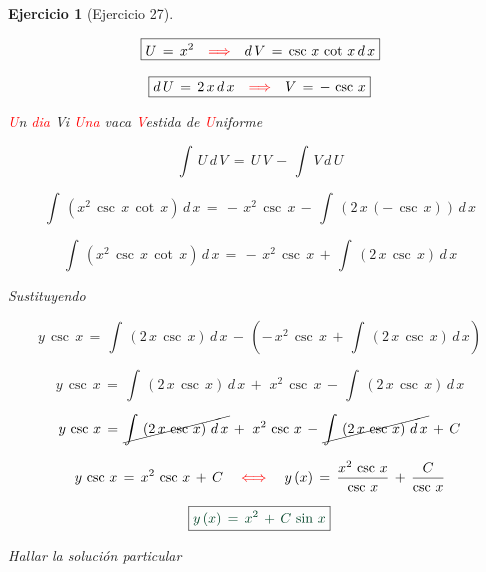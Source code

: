 \documentclass[a4paper,11pt]{book}
\newtheorem{ejer}{Ejercicio}[section]
\begin{document}
\begin{ejer}[Ejercicio 27]
\begin{tcolorbox}[colback=red!5!white,colframe=red!75!black,fonttitle=\bfseries,title=$I_{2}$]
  

$$\boxed{U\,=\,x^{2} \quad \textcolor{red}{\Longrightarrow} \quad d\,V\,=\,\csc\,x\,\cot\,x\,d\,x }$$ 

  

$$\boxed{d\,U\,=\,2\,x\,d\,x \quad \textcolor{red}{\Longrightarrow} \quad V\,=\,-\,\csc\,x }$$ 

 


\textcolor{red}{U}n \textcolor{red}{dia} Vi \textcolor{red}{Una} vaca \textcolor{red}{V}estida de \textcolor{red}{U}niforme      



  

$$\int\,U\,d\,V\,=\,U\,V\,-\,\int\,V\,d\,U$$ 

  

$$\int\,\left(x^{2}\,\csc\,x\,\cot\,x \right)\,d\,x\,=\,-\,x^{2}\,\csc\,x\,-\,\int\,\left(2\,x\,(-\,\csc\,x) \right)\,d\,x$$ 

  

$$\boxed{\int\,\left(x^{2}\,\csc\,x\,\cot\,x \right)\,d\,x\,=\,-\,x^{2}\,\csc\,x\,+\,\int\,\left(2\,x\,\csc\,x \right)\,d\,x}$$ 

  

\end{tcolorbox} 

  

Sustituyendo 

  

$$y\,\csc\,x\,=\,\int\,\left( 2\,x\,\csc\,x \right)\,d\,x\,-\,\left(-\,x^{2}\,\csc\,x\,+\,\int\,\left(2\,x\,\csc\,x \right)\,d\,x \right)$$ 

  

$$y\,\csc\,x\,=\,\int\,\left( 2\,x\,\csc\,x \right)\,d\,x\,+\,\,x^{2}\,\csc\,x\,-\,\int\,\left(2\,x\,\csc\,x \right)\,d\,x $$ 

  

$$y\,\csc\,x\,=\,\cancel{\int\,\left( 2\,x\,\csc\,x \right)\,d\,x}\,+\,\,x^{2}\,\csc\,x\,-\,\cancel{\int\,\left(2\,x\,\csc\,x \right)\,d\,x}\,+\,C $$ 

  

$$y\,\csc\,x\,=\,x^{2}\,\csc\,x\,+\,C\quad \textcolor{red}{\iff} \quad y\,(x)\,=\,\dfrac{x^{2}\,\csc\,x}{\csc\,x}\,+\,\dfrac{C}{\csc\,x}$$ 

  

$$\boxed{\textcolor{britishracinggreen}{y\,(x)\,=\,x^{2}\,+\,C\,\sin\,x}}$$ 

  

 Hallar la solución particular 


\end{ejer}
\end{document}
